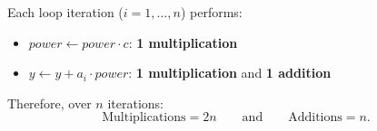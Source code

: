 Each loop iteration ($i=1,\dots,n$) performs:
\begin{itemize}
  \item $power \leftarrow power\cdot c$: \textbf{1 multiplication}
  \item $y \leftarrow y + a_i\cdot power$: \textbf{1 multiplication} and \textbf{1 addition}
\end{itemize}

Therefore, over $n$ iterations:
\[
\boxed{\text{Multiplications} = 2n} 
\qquad\text{and}\qquad
\boxed{\text{Additions} = n}.
\]
